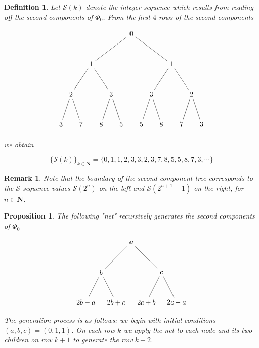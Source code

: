 \documentclass{article}
\newtheorem{definition}[theorem]{Definition}  %
\newtheorem{proposition}[theorem]{Proposition}  %
\newtheorem{remark}[theorem]{Remark}  %
\begin{document}
\begin{definition}
Let $\mathcal{S}(k)$ denote the integer sequence which results from reading off the second components of $\Phi_0$. From the first $4$ rows of the second components

$$
\begin{tikzpicture}[level distance=1.5cm,
  level 1/.style={sibling distance=4cm},
  level 2/.style={sibling distance=2cm},
  level 3/.style={sibling distance=1cm}]
  \node {$0$}
    child {node {$1$}
      child {node {$2$}
        child {node {$3$}}
        child {node {$7$}}
      }
      child {node {$3$}
        child {node {$8$}}
        child {node {$5$}}
      }
    }
    child {node {$1$}
      child {node {$3$}
        child {node {$5$}}
        child {node {$8$}}
      }
      child {node {$2$}
        child {node {$7$}}
        child {node {$3$}}
      }
    };
\end{tikzpicture}
$$

we obtain

$$\{ \mathcal{S}(k) \}_{k \in \mathbf{N}} = \{0,1,1,2,3,3,2,3,7,8,5,5,8,7,3, \cdots \}$$
\end{definition}

\begin{remark}
Note that the boundary of the second component tree corresponds to the $\mathcal{S}$-sequence values $\mathcal{S}(2^n)$ on the left and  $\mathcal{S}(2^{n+1} - 1)$ on the right, for $n \in \mathbf{N}$.
\end{remark}

\begin{proposition}\label{n_components_net}
The following "net" recursively generates the second components of $\Phi_0$

$$\begin{tikzpicture}[level distance=1.5cm,
  level 1/.style={sibling distance=3cm},
  level 2/.style={sibling distance=1.5cm}]
  \node {$a$}
    child {node {$b$}
      child {node {$2b-a$}}
      child {node {$2b+c$}}
    }
    child {node {$c$}
      child {node {$2c+b$}}
      child {node {$2c-a$}}
    };
\end{tikzpicture}$$
The generation process is as follows:
we begin with initial conditions $(a, b, c) = (0, 1, 1)$. On each row $k$ we apply the net to each node and its two children on row $k+1$ to generate the row $k+2$. 
\end{proposition}
\end{document}
